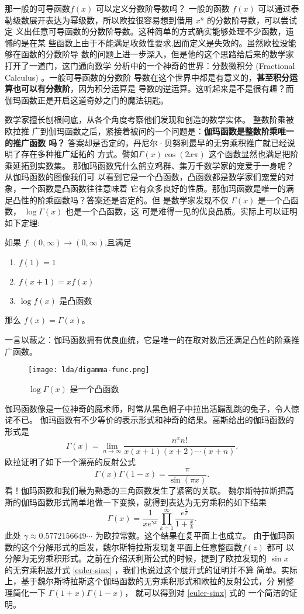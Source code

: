 {那一般的可导函数$f(x)$ 可以定义分数阶导数吗？ 一般的函数 $f(x)$ 可以通过泰
勒级数展开表达为幂级数，所以欧拉很容易想到借用 $x^n$ 的分数阶导数，可以尝试定
义出任意可导函数的分数阶导数。这种简单的方式确实能够处理不少函数，遗憾的是在某
些函数上由于不能满足收敛性要求,因而定义是失效的。虽然欧拉没能够在函数的分数阶导
数的问题上进一步深入，但是他的这个思路给后来的数学家打开了一道门，这门通向数学
分析中的一个神奇的世界：分数微积分 (Fractional Calculus) 。一般可导函数的分数阶
导数在这个世界中都是有意义的，{\bf 甚至积分运算也可以有分数阶}，因为积分运算是
导数的逆运算。这听起来是不是很有趣？而伽玛函数正是开启这道奇妙之门的魔法钥匙。 


数学家擅长刨根问底，从各个角度考察他们发现和创造的数学实体。 整数阶乘被欧拉推
广到伽玛函数之后，紧接着被问的一个问题是：{\bf 伽玛函数是整数阶乘唯一的推广函数
吗？} 答案却是否定的，丹尼尔·贝努利最早的无穷乘积推广就已经说明了存在多种推广延拓的
方式。譬如$\Gamma(x) \cos (2x\pi)$ 这个函数显然也满足把阶乘延拓到实数集。 
那伽玛函数凭什么鹤立鸡群、集万千数学家的宠爱于一身呢？从伽玛函数的图像我们可
以看到它是一个凸函数，凸函数都是数学家们宠爱的对象，一个函数是凸函数往往意味着
它有众多良好的性质。那伽玛函数是唯一的满足凸性的阶乘函数吗？答案还是否定的。但
是数学家发现不仅 $\Gamma(x)$ 是一个凸函数， $\log\Gamma(x)$ 也是一个凸函数，这
可是难得一见的优良品质。实际上可以证明如下定理:
\begin{theorem} 如果 $f:(0,\infty)\rightarrow (0,\infty)$,且满足
\begin{enumerate}
\item $f(1) = 1$
\item $f(x+1) = xf(x)$
\item $\log f(x)$ 是凸函数
\end{enumerate}
那么 $f(x) = \Gamma(x)$。
\end{theorem}
一言以蔽之：伽玛函数拥有优良血统，它是唯一的在取对数后还满足凸性的阶乘推广函数。

\begin{figure}[htbp]
\centering
\texttt{[image: lda/digamma-func.png]}
\caption{$\log \Gamma(x)$ 是一个凸函数}
\end{figure}

伽玛函数像是一位神奇的魔术师，时常从黑色帽子中拉出活蹦乱跳的兔子，令人惊诧不已。
伽玛函数有不少等价的表示形式和神奇的结果。高斯给出的伽玛函数的形式是
$$ \Gamma(x) = \lim_{n\rightarrow\infty} \frac{n^x n!}{x(x+1)(x+2)\cdots(x+n)} .$$
欧拉证明了如下一个漂亮的反射公式
$$ \Gamma(x) \Gamma(1-x) = \frac{\pi}{\sin (\pi x)} .$$
看！伽玛函数和我们最为熟悉的三角函数发生了紧密的关联。
魏尔斯特拉斯把高斯的伽玛函数形式简单地做一下变换，就得到表达为无穷乘积的如下结果
$$ {\Gamma(x)} = \frac{1}{xe^{\gamma x}} \prod_{k=1}^\infty
\frac{e^{\frac{x}{k}}} {1+\frac{x}{k}} .$$
此处 $\gamma \approx 0.5772156649\cdots$ 为欧拉常数。这个结果在复平面上也成立。
由于伽玛函数的这个分解形式的启发，魏尔斯特拉斯发现复平面上任意整函数$f(z)$ 都可
以分解为无穷乘积形式。之前在介绍沃利斯公式的时候，提到了欧拉发现的
$\sin x$ 的无穷乘积展开式 \eqref{euler-sinx} ，我们也说过这个展开式的证明并不算
简单。实际上，基于魏尔斯特拉斯这个伽玛函数的无穷乘积形式和欧拉的反射公式，分
别整理简化一下 $\Gamma(1+x)\Gamma(1-x)$， 就可以得到对 \eqref{euler-sinx} 式的
一个简洁的证明。

}
